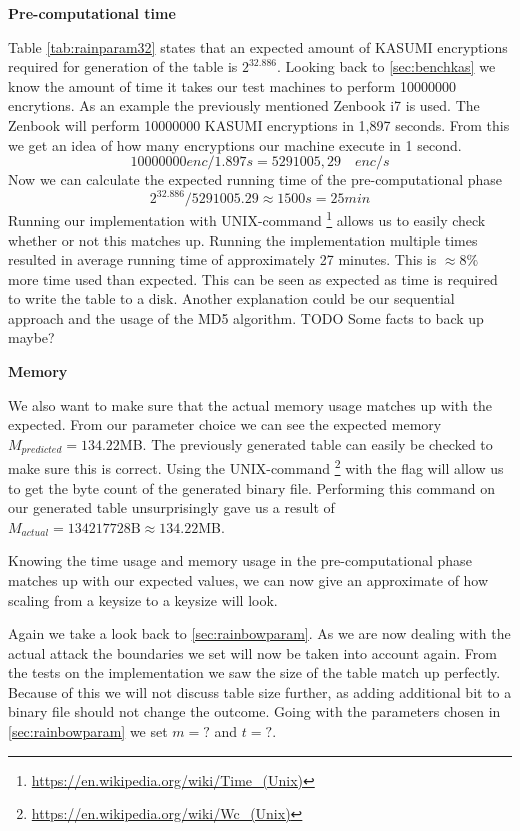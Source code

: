 \textbf{Pre-computational time}

Table \ref{tab:rainparam32} states that an expected amount of
KASUMI encryptions required for generation of the table is
$2^{32.886}$. Looking back to \ref{sec:benchkas} we know the
amount of time it takes our test machines to perform 10000000 encrytions. As an
example the previously mentioned Zenbook i7 is used. The
Zenbook will perform 10000000 KASUMI encryptions in 1,897
seconds. From this we get an idea of how many encryptions our
machine execute in 1 second.
\[10000000 enc / 1.897 s = 5291005,29 \quad enc/s\]
Now we can calculate the expected running time of the
pre-computational phase
\[2^{32.886} / 5291005.29 \approx 1500s = 25 min \]
Running our implementation with UNIX-command
\footnote{\url{https://en.wikipedia.org/wiki/Time_(Unix)}}
allows us to easily check whether or not this matches up. Running the
implementation multiple times resulted in average running time of
approximately 27 minutes. This is $\approx8\%$ more time used than
expected. This can be seen as expected as time is required to write
the table to a disk. Another explanation could be our sequential
approach and the usage of the MD5 algorithm. TODO Some facts to back up maybe?

\textbf{Memory}

We also want to make sure that the actual memory usage matches up with
the expected. From our parameter choice we can see the expected memory
$M_{predicted}=134.22$MB. The previously generated table can easily be
checked to make sure this is correct. Using the UNIX-command
\footnote{\url{https://en.wikipedia.org/wiki/Wc_(Unix)}} with
the  flag will allow us to get the byte count of the
generated binary file. Performing this command on our generated table
unsurprisingly gave us a result of
$M_{actual}=134217728\text{B}\approx134.22$MB.

Knowing the time usage and memory usage in the pre-computational phase
matches up with our expected values, we can now give an approximate of
how scaling from a  keysize to a  keysize
will look.

Again we take a look back to \ref{sec:rainbowparam}. As we are now
dealing with the actual  attack the boundaries we set
will now be taken into account again. From the tests on the
 implementation we saw the size of the table match up
perfectly. Because of this we will not discuss table size further, as
adding additional bit to a binary file should not change the outcome.
Going with the parameters chosen in \ref{sec:rainbowparam} we set
$m=?$ and $t=?$.

